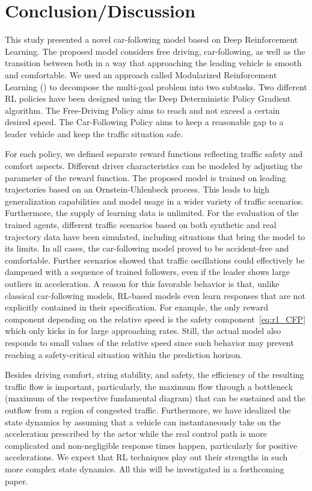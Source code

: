 \documentclass[review]{elsarticle}
\providecommand{\3}{{\ss}}
\begin{document}
	\section{Conclusion/Discussion}
	\label{sec:conclusion}
	This study presented a novel car-following model based on
	Deep Reinforcement Learning. The
	proposed model considers free driving, car-following, as well as the
	transition between both in a way that approaching the leading vehicle
	is smooth and comfortable. We used an approach called Modularized
	Reinforcement Learning (\cite{MRL}) to decompose the multi-goal
	problem into two subtasks. Two different RL policies have been
	designed using the Deep Deterministic Policy Gradient algorithm. The
	Free-Driving Policy aims to reach and not exceed a certain
	desired speed. The Car-Following Policy aims to keep a reasonable gap
	to a leader vehicle and keep the traffic situation safe. 
	
	For each policy, we defined separate reward functions reflecting traffic safety and comfort aspects. 
	Different driver characteristics can be modeled by adjusting the parameter of the reward function.	
	The proposed model is trained on leading trajectories based on an
	Ornstein-Uhlenbeck process. This leads to high generalization capabilities and model usage in a wider variety of traffic scenarios. Furthermore, the
	supply of learning data is unlimited.
	For the evaluation of the trained agents, different traffic scenarios
	based on both synthetic and
	real trajectory data have been simulated, including situations that
	bring the model to its limits. 
	In all cases, the car-following model proved to be accident-free and
	comfortable. Further scenarios showed that traffic oscillations could
	effectively be dampened with a sequence of trained followers, even if
	the leader shows large outliers in acceleration.
	A reason for this favorable behavior is that, unlike
	classical car-following models, RL-based models
	even learn responses that are not explicitly contained in their
	specification. For example, the only reward component depending on
	the relative speed is the safety component~\eqref{eq:r1_CFP}
	which only kicks in for large approaching rates. Still, the
	actual model also responds to small values of the relative
	speed since such behavior may prevent reaching a
	safety-critical situation within the prediction horizon.
	
	Besides driving comfort, string stability, and safety,
	the efficiency of the resulting traffic flow is important,
	particularly, the maximum flow through a
	bottleneck (maximum of the respective fundamental diagram) that can be 
	sustained and the outflow from a region of congested
	traffic. Furthermore, we have idealized the state dynamics by
	assuming that a vehicle can instantaneously take on the acceleration
	prescribed by the actor while the real control path is more
	complicated and non-negligible response times happen, particularly
	for positive accelerations. We expect that RL techniques play out
	their strengths in such more complex state dynamics. All this  will
	be investigated in a forthcoming paper.
	
\end{document}
